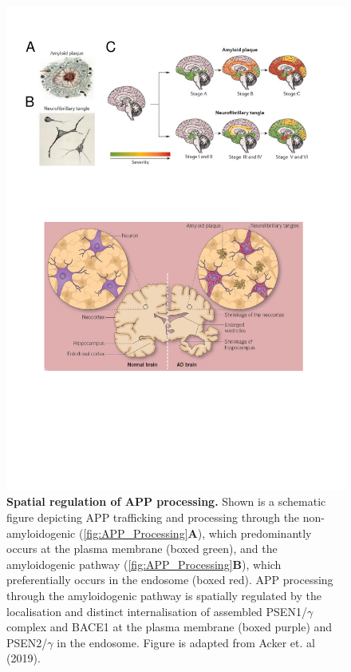 \begin{figure}[!htp]
	\centering
	\includegraphics[page=6,trim={0 8cm 0cm 0cm},clip, scale = 0.7]{Figures/Introduction_Figures.pdf}
	\captionsetup{width=0.95\textwidth,singlelinecheck=off}
	\caption[Spatial regulation of APP trafficking and processing]%
	{\textbf{Spatial regulation of APP processing.} Shown is a schematic figure depicting APP trafficking and processing through the non-amyloidogenic (\cref{fig:APP_Processing}\textbf{A}), which predominantly occurs at the plasma membrane (boxed green), and the amyloidogenic pathway (\cref{fig:APP_Processing}\textbf{B}), which preferentially occurs in the endosome (boxed red). APP processing through the amyloidogenic pathway is spatially regulated by the localisation and distinct internalisation of assembled PSEN1/$\gamma$ complex and BACE1 at the plasma membrane (boxed purple) and PSEN2/$\gamma$ in the endosome. Figure is adapted from Acker et. al (2019)\cite{Acker2019}.  
	}
	\label{fig:APP_Trafficking}
\end{figure}

